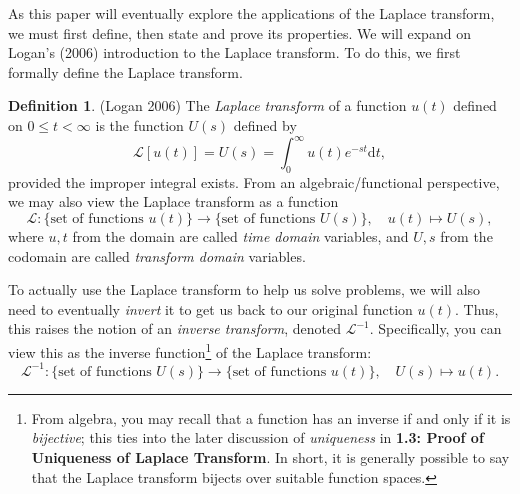 \documentclass[12pt]{article}
\theoremstyle{plain}
\theoremstyle{definition}
\newtheorem{definition}[theorem]{Definition} %
\begin{document}
As this paper will eventually explore the applications of the Laplace transform, we must first define, then state and prove its properties. We will expand on Logan's (2006) introduction to the Laplace transform. To do this, we first formally define the Laplace transform.
\begin{definition}
    (Logan 2006) The \emph{Laplace transform} of a function $u(t)$ defined on $0\leq t < \infty$ is the function $U(s)$ defined by
    \begin{equation*}
        \mathcal{L}[u(t)]=U(s) = \int_{0}^{\infty}u(t)e^{-st} \mathrm{d}t,
    \end{equation*}
    provided the improper integral exists\footnotemark. From an algebraic/functional perspective, we may also view the Laplace transform as a function
    \[
    \mathcal{L}\colon \{\text{set of functions $u(t)$}\} \to \{\text{set of functions $U(s)$}\}, \quad u(t)\mapsto U(s),
    \]
    where $u,t$ from the domain are called \emph{time domain} variables, and $U,s$ from the codomain are called \emph{transform domain} variables.
\end{definition}

To actually use the Laplace transform to help us solve problems, we will also need to eventually \emph{invert} it to get us back to our original function $u(t)$. Thus, this raises the notion of an \emph{inverse transform}, denoted $\mathcal{L}^{-1}$. Specifically, you can view this as the inverse function\footnote{From algebra, you may recall that a function has an inverse if and only if it is \emph{bijective}; this ties into the later discussion of \emph{uniqueness} in \textbf{1.3: Proof of Uniqueness of Laplace Transform}. In short, it is generally possible to say that the Laplace transform bijects over suitable function spaces.} of the Laplace transform:
\[
\mathcal{L}^{-1}\colon \{\text{set of functions $U(s)$}\} \to \{\text{set of functions $u(t)$}\}, \quad U(s)\mapsto u(t).
\]
\end{document}
